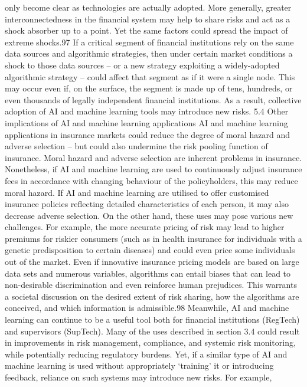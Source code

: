 \documentclass[]{article}
\begin{document}
only become clear as technologies are actually adopted. More generally,
greater interconnectedness in the financial system may help to share
risks and act as a shock absorber up to a point. Yet the same factors
could spread the impact of extreme shocks.97 If a critical segment of
financial institutions rely on the same data sources and algorithmic
strategies, then under certain market conditions a shock to those data
sources -- or a new strategy exploiting a widely-adopted algorithmic
strategy -- could affect that segment as if it were a single node. This
may occur even if, on the surface, the segment is made up of tens,
hundreds, or even thousands of legally independent financial
institutions. As a result, collective adoption of AI and machine
learning tools may introduce new risks. 5.4 Other implications of AI and
machine learning applications AI and machine learning applications in
insurance markets could reduce the degree of moral hazard and adverse
selection -- but could also undermine the risk pooling function of
insurance. Moral hazard and adverse selection are inherent problems in
insurance. Nonetheless, if AI and machine learning are used to
continuously adjust insurance fees in accordance with changing behaviour
of the policyholders, this may reduce moral hazard. If AI and machine
learning are utilised to offer customised insurance policies reflecting
detailed characteristics of each person, it may also decrease adverse
selection. On the other hand, these uses may pose various new
challenges. For example, the more accurate pricing of risk may lead to
higher premiums for riskier consumers (such as in health insurance for
individuals with a genetic predisposition to certain diseases) and could
even price some individuals out of the market. Even if innovative
insurance pricing models are based on large data sets and numerous
variables, algorithms can entail biases that can lead to non-desirable
discrimination and even reinforce human prejudices. This warrants a
societal discussion on the desired extent of risk sharing, how the
algorithms are conceived, and which information is admissible.98
Meanwhile, AI and machine learning can continue to be a useful tool both
for financial institutions (RegTech) and supervisors (SupTech). Many of
the uses described in section 3.4 could result in improvements in risk
management, compliance, and systemic risk monitoring, while potentially
reducing regulatory burdens. Yet, if a similar type of AI and machine
learning is used without appropriately `training' it or introducing
feedback, reliance on such systems may introduce new risks. For example,
\end{document}
